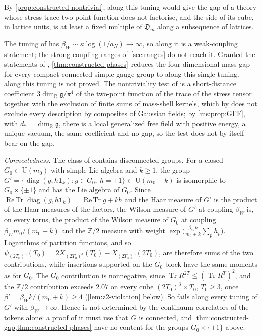 \documentclass[11pt,a4paper]{amsart}
\theoremstyle{definition}
\theoremstyle{remark}
\numberwithin{equation}{section}
\DeclareMathOperator{\Tr}{Tr}        %
\DeclareMathOperator{\ReTr}{Re\,Tr}  %
\newcommand{\R}{\mathbb{R}}          %
\newcommand{\Z}{\mathbb{Z}}          %
\newcommand{\U}{\mathrm{U}}                %
\newcommand{\TT}{\mathbb{T}}               %
\newcommand{\Zc}{\mathcal{Z}}              %
\newcommand{\XT}[2]{X_{#1}(#2)}            %
\newcommand{\psiT}[2]{\psi_{#1}(#2)}       %
\newcommand{\cube}[1]{(2#1)^3}             %
\newcommand{\Mcirc}{\text{\upshape(M$^{\circ}$)}}   %
\newcommand{\aN}{a_N}                      %
\newcommand{\Den}{\mathfrak D}            %
\newcommand{\betaW}{\beta_{W}}             %
\begin{document}
By \cref{prop:constructed-nontrivial}, \Mcirc{} along this tuning would give the gap of a theory whose stress-trace two-point function does not factorise, and the side of its cube, in lattice units, is at least a fixed multiple of $\Den_m$ along a subsequence of lattices.

The tuning of \cite{openaiym} has $\betaW\sim\kappa\log(1/\aN)\to\infty$, so \Mcirc{} along it is a weak-coupling statement; the strong-coupling ranges of \cref{sec:ranges} do not reach it. Granted the statements of \cite{openaiym,ymgroup2026}, \cref{thm:constructed-phases} reduces the four-dimensional mass gap for every compact connected simple gauge group to \Mcirc{} along this single tuning. \Mcirc{} along this tuning is not proved. The nontriviality test of \cite{openaiym} is a short-distance coefficient $3\dim_\R\mathfrak g/\pi^4$ of the two-point function of the trace of the stress tensor together with the exclusion of finite sums of mass-shell kernels, which by \cite{ymgroup2026} does not exclude every description by composites of Gaussian fields; by \cref{ms:prop:GFF}, with $d_*=\dim_\R\mathfrak g$, there is a local generalized free field with positive energy, a unique vacuum, the same coefficient and no gap, so the test does not by itself bear on the gap.

\emph{Connectedness.} The class of \cite{openaiym} contains disconnected groups. For a closed $G_0\subset\U(m_0)$ with simple Lie algebra and $k\ge1$, the group $G'=\{\operatorname{diag}(g,h\mathbf 1_k):g\in G_0,\ h=\pm1\}\subset\U(m_0+k)$ is isomorphic to $G_0\times\{\pm1\}$ and has the Lie algebra of $G_0$. Since $\ReTr\operatorname{diag}(g,h\mathbf 1_k)=\ReTr g+kh$ and the Haar measure of $G'$ is the product of the Haar measures of the factors, the Wilson measure of $G'$ at coupling $\betaW$ is, on every torus, the product of the Wilson measure of $G_0$ at coupling $\betaW m_0/(m_0+k)$ and the $\Z/2$ measure with weight $\exp\bigl(\frac{\betaW k}{m_0+k}\sum_ph_p\bigr)$. Logarithms of partition functions, and so $\psiT{\cube{T_0}}{T_0}=2\XT{\cube{T_0}}{T_0}-\XT{\cube{T_0}}{2T_0}$, are therefore sums of the two contributions, while insertions supported on the $G_0$ block have the same moments as for $G_0$. The $G_0$ contribution is nonnegative, since $\Tr R^{2T}\le(\Tr R^T)^2$, and the $\Z/2$ contribution exceeds $2.07$ on every cube $\cube{T_0}\times T_0$, $T_0\ge3$, once $\beta'=\betaW k/(m_0+k)\ge4$ (\cref{lem:z2-violation} below). So \Mcirc{} fails along every tuning of $G'$ with $\betaW\to\infty$. Hence \Mcirc{} is not determined by the continuum correlators of the tokens alone: a proof of it must use that $G$ is connected, and \cref{thm:constructed-gap,thm:constructed-phases} have no content for the groups $G_0\times\{\pm1\}$ above.
\end{document}

